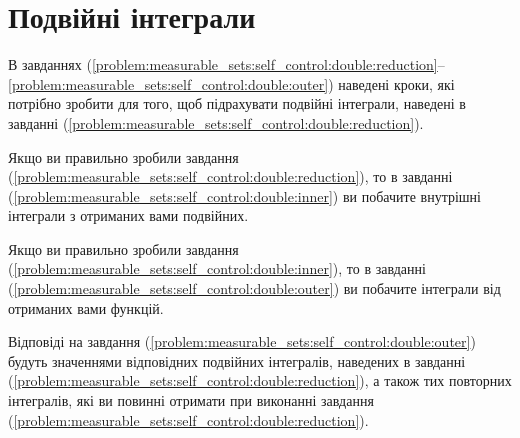 \section{Подвійні інтеграли}
В завданнях (\ref{problem:measurable_sets:self_control:double:reduction}--\ref{problem:measurable_sets:self_control:double:outer}) наведені кроки, які потрібно зробити для того, щоб підрахувати подвійні інтеграли, наведені в завданні  (\ref{problem:measurable_sets:self_control:double:reduction}).

Якщо ви правильно зробили завдання  (\ref{problem:measurable_sets:self_control:double:reduction}), то в завданні (\ref{problem:measurable_sets:self_control:double:inner}) ви побачите внутрішні інтеграли з отриманих вами подвійних.

Якщо ви правильно зробили завдання  (\ref{problem:measurable_sets:self_control:double:inner}), то в завданні (\ref{problem:measurable_sets:self_control:double:outer}) ви побачите інтеграли від отриманих вами функцій.

Відповіді на завдання (\ref{problem:measurable_sets:self_control:double:outer}) будуть значеннями відповідних подвійних інтегралів, наведених в завданні (\ref{problem:measurable_sets:self_control:double:reduction}), а також тих повторних інтегралів, які ви повинні отримати при виконанні завдання (\ref{problem:measurable_sets:self_control:double:reduction}).


